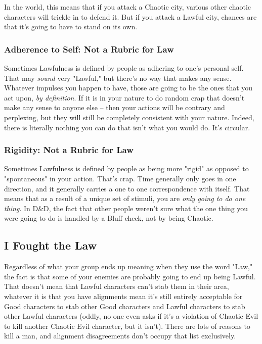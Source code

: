 In the world, this means that if you attack a Chaotic city, various other chaotic characters will trickle in to defend it. But if you attack a Lawful city, chances are that it's going to have to stand on its own.

\subsubsection{Adherence to Self: Not a Rubric for Law}
Sometimes Lawfulness is defined by people as adhering to one's personal self. That may \textit{sound} very "Lawful," but there's no way that makes any sense. Whatever impulses you happen to have, those are going to be the ones that you act upon, \textit{by definition}. If it is in your nature to do random crap that doesn't make any sense to anyone else -- then your actions will be contrary and perplexing, but they will still be completely consistent with your nature. Indeed, there is literally nothing you can do that isn't what you would do. It's circular.

\subsubsection{Rigidity: Not a Rubric for Law}
Sometimes Lawfulness is defined by people as being more "rigid" as opposed to "spontaneous" in your action. That's crap. Time generally only goes in one direction, and it generally carries a one to one correspondence with itself. That means that as a result of a unique set of stimuli, you are \textit{only going to do one thing}. In D\&D, the fact that other people weren't sure what the one thing you were going to do is handled by a Bluff check, not by being Chaotic.


\subsection{I Fought the Law}

Regardless of what your group ends up meaning when they use the word "Law," the fact is that some of your enemies are probably going to end up being Lawful. That doesn't mean that Lawful characters can't stab them in their area, whatever it is that you have alignments mean it's still entirely acceptable for Good characters to stab other Good characters and Lawful characters to stab other Lawful characters (oddly, no one even asks if it's a violation of Chaotic Evil to kill another Chaotic Evil character, but it isn't). There are lots of reasons to kill a man, and alignment disagreements don't occupy that list exclusively.


